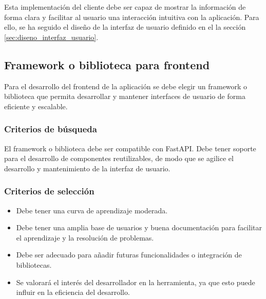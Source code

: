 Esta implementación del cliente debe ser capaz de mostrar la información de forma clara y facilitar al usuario una interacción intuitiva con la aplicación. Para ello, se ha seguido el diseño de la interfaz de usuario definido en el la sección \ref{sec:diseno_interfaz_usuario}.


\subsection{Framework o biblioteca para frontend}
Para el desarrollo del frontend de la aplicación se debe elegir un framework o biblioteca que permita desarrollar y mantener interfaces de usuario de forma eficiente y escalable. 

\subsubsection{Criterios de búsqueda}
El framework o biblioteca debe ser compatible con FastAPI. Debe tener soporte para el desarrollo de componentes reutilizables, de modo que se agilice el desarrollo y mantenimiento de la interfaz de usuario. 

\subsubsection{Criterios de selección}
\begin{itemize}
    \item Debe tener una curva de aprendizaje moderada.
    \item Debe tener una amplia base de usuarios y buena documentación para facilitar el aprendizaje y la resolución de problemas.
    \item Debe ser adecuado para añadir futuras funcionalidades o integración de bibliotecas.
    \item Se valorará el interés del desarrollador en la herramienta, ya que esto puede influir en la eficiencia del desarrollo.
\end{itemize}

